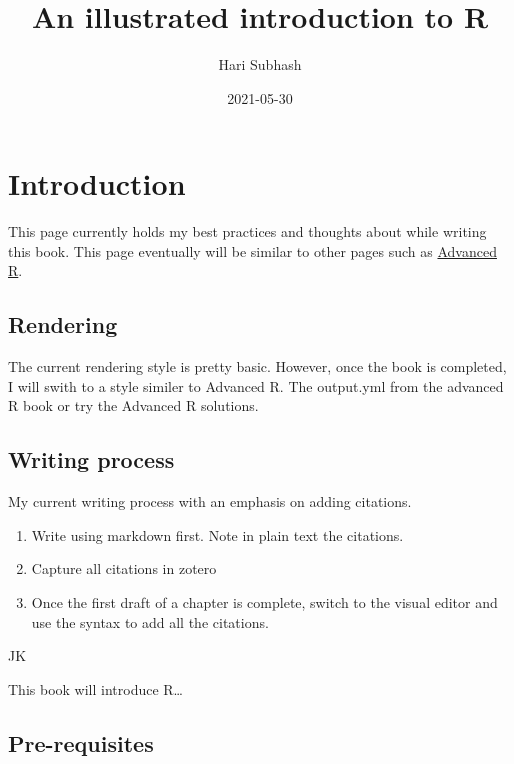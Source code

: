 \documentclass[
]{book}
\title{An illustrated introduction to R}
\author{Hari Subhash}
\date{2021-05-30}
\providecommand{\tightlist}{%
  \setlength{\itemsep}{0pt}\setlength{\parskip}{0pt}}
\begin{document}
\maketitle

{
\setcounter{tocdepth}{1}
\tableofcontents
}
\hypertarget{introduction}{%
\chapter{Introduction}\label{introduction}}

This page currently holds my best practices and thoughts about while writing this book. This page eventually will be similar to other pages such as \href{https://adv-r.hadley.nz/}{Advanced R}.

\hypertarget{rendering}{%
\section{Rendering}\label{rendering}}

The current rendering style is pretty basic. However, once the book is completed, I will swith to a style similer to Advanced R. The output.yml from the advanced R book or try the Advanced R solutions.

\hypertarget{writing-process}{%
\section{Writing process}\label{writing-process}}

My current writing process with an emphasis on adding citations.

\begin{enumerate}
\def\labelenumi{\arabic{enumi}.}
\tightlist
\item
  Write using markdown first. Note in plain text the citations.
\item
  Capture all citations in zotero
\item
  Once the first draft of a chapter is complete, switch to the visual editor and use the \citep{6functi} syntax to add all the citations.
\end{enumerate}

JK

This book will introduce R\ldots{}

\hypertarget{pre-requisites}{%
\section{Pre-requisites}\label{pre-requisites}}
\end{document}
